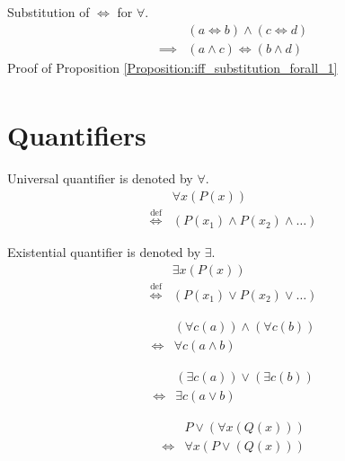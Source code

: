 \begin{prop}
\label{Proposition:iff_substitution_forall_1}
Substitution of $\iff$ for $\forall$.
\begin{align*}
& (a \iff b) \land (c \iff d) \\
\implies & (a \land c) \iff (b \land d)
\end{align*}
Proof of Proposition \ref{Proposition:iff_substitution_forall_1}
\begin{align*}
\end{align*}
\end{prop}

\section{Quantifiers}
\begin{defn}
Universal quantifier is denoted by $\forall$.
\begin{align*}
& \forall x (P(x)) \\
\overset{\operatorname{def}}{\iff} & (P(x_1) \land P(x_2) \land \dots)
\end{align*}
\end{defn}

\begin{defn}
Existential quantifier is denoted by $\exists$.
\begin{align*}
& \exists x (P(x)) \\
\overset{\operatorname{def}}{\iff} & (P(x_1) \lor P(x_2) \lor \dots)
\end{align*}
\end{defn}

\begin{prop}
\label{Proposition:forall_land_commutativity}
\begin{align*}
& (\forall c (a)) \land (\forall c (b)) \\
\iff & \forall c (a \land b)
\end{align*}
\end{prop}

\begin{prop}
\label{Proposition:exists_lor_commutativity}
\begin{align*}
& (\exists c (a)) \lor (\exists c (b)) \\
\iff & \exists c (a \lor b)
\end{align*}
\end{prop}

\begin{prop}
\label{Proposition:lor_forall_distributivity}
\begin{align*}
& P \lor (\forall x (Q(x))) \\
\iff & \forall x (P \lor (Q(x)))
\end{align*}
\end{prop}

